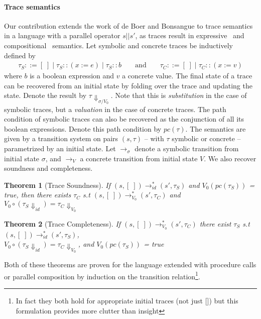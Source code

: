 \documentclass[submission,copyright,creativecommons]{eptcs}
\newtheorem{theorem}{Theorem}
\begin{document}
\paragraph{Trace semantics}
Our contribution extends the work of de Boer and Bonsangue to trace semantics in a language with a parallel operator $s |\!| s'$,
as traces result in expressive~\cite{tracemodality2020, Mazurkiewicz1977} and compositional~\cite{din2022lagc} semantics.
Let symbolic and concrete traces be inductively defined by
\begin{align*}
  \tau_{S} ::= [\;] \mid \tau_{S} :: (x := e) \mid \tau_{S} :: b
  && \mbox{ and } &&
  \tau_{C} ::= [\;] \mid \tau_{C} :: (x := v)
\end{align*}
where $b$ is a boolean expression and $v$ a concrete value.
The final state of a trace can be recovered from an initial state by folding over
the trace and updating the state. Denote the result by $\tau\Downarrow_{\sigma / V_{0}}$. Note that this is \emph{substitution}
in the case of symbolic traces, but a \emph{valuation} in the case of concrete traces.
The path condition of symbolic traces can also be recovered as the conjunction of all its boolean expressions.
Denote this path condition by $pc(\tau)$.
The semantics are given by a transition system on pairs $(s, \tau)$ -- with $\tau$ symbolic or concrete --
parametrized by an initial state. Let $\rightarrow_{\sigma}$ denote a symbolic transition from initial state $\sigma$,
and $\rightarrow_{V}$ a concrete transition from initial state $V$.
We also recover soundness and completeness.
\begin{theorem}[Trace Soundness]
  If $(s, [\;]) \rightarrow_{id}^{*} (s', \tau_{S})$ and $V_{0}(pc(\tau_{S}))$ = true,
  then there exists $\tau_{C}$ s.t $(s, [\;]) \rightarrow_{V_0}^{*} (s', \tau_{C})$ and
    $V_{0} \circ (\tau_{S}\Downarrow_{id}) = \tau_{C}\Downarrow_{V_{0}}$
\end{theorem}

\begin{theorem}[Trace Completeness]
  If $(s, [\;]) \rightarrow_{V_{0}}^{*} (s', \tau_{C})$ there exist $\tau_{S}$ s.t
  $(s, [\;]) \rightarrow_{id}^{*} (s', \tau_{S})$,\\
  $V_{0} \circ (\tau_{S} \Downarrow_{id}) = \tau_{C}\Downarrow_{V_{0}}$, and $V_{0}(pc(\tau_{S}))$ = true
\end{theorem}
Both of these theorems are proven for the language extended with procedure calls or parallel composition
by induction on the transition relation\footnote{In fact they both hold for appropriate initial traces (not just [])
but this formulation provides more clutter than insight}.
\end{document}
